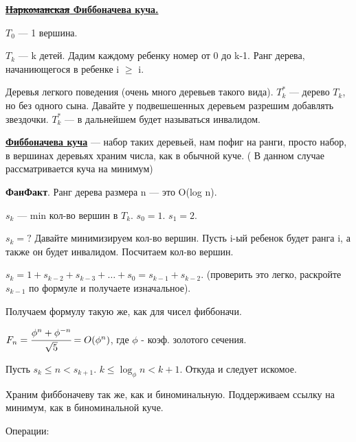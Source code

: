 \documentclass{article}
\newcommand{\deff}[1]{\underline{\textbf{#1}}}
\begin{document}
\deff{\sout{Наркоманская} Фиббоначева куча.}

$T_0$ ---  1 вершина.

$T_k$ ---  k детей. Дадим каждому ребенку номер от 0 до k-1. Ранг дерева, начаниющегося в ребенке i $\geq $ i.

Деревья легкого поведения (очень много деревьев такого вида). $T_k^*$ --- дерево $T_k$, но без одного сына. Давайте у подвешешенных деревьем разрешим добавлять звездочки. $T_k^*$ --- в дальнейшем будет называться инвалидом.

\deff{Фиббоначева куча} --- набор таких деревьей, нам пофиг на ранги, просто набор, в вершинах деревьях храним числа, как  в обычной куче. ( В данном случае рассматривается куча на минимум)

\textbf{ФанФакт}. Ранг дерева размера n --- это O(log n).

$s_k$ --- min кол-во вершин в $T_k$. $s_0 =1$. $s_1 =2$.

$s_k = ?$ Давайте минимизируем кол-во вершин. Пусть i-ый ребенок будет ранга i, а также он будет инвалидом. Посчитаем кол-во вершин. 

$s_k = 1+ s_{k-2}+s_{k-3}+\ldots + s_0 = s_{k-1} +s_{k-2}$. (проверить это легко, раскройте $s_{k-1}$ по формуле и получаете изначальное). 

Получаем формулу такую же, как для чисел фиббоначи.

$F_n = \cfrac{\phi^n + \phi^{-n}}{\sqrt{5}}=O(\phi^n)$, где $\phi$ - коэф. золотого сечения.

Пусть $s_k \leq n < s_{k+1}$. $k\leq \log_{\phi} n<k+1$. Откуда и следует искомое.

Храним фиббоначеву так же, как и биноминальную. Поддерживаем ссылку на минимум, как в биноминальной куче.

Операции:
\end{document}
